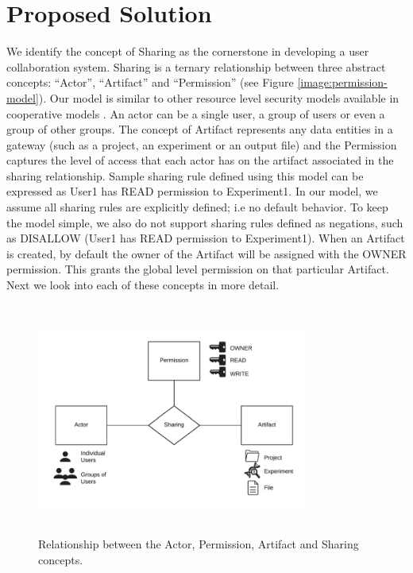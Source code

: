 \documentclass[sigconf]{acmart}
\begin{document}
\section{Proposed Solution}
We identify the concept of Sharing as the cornerstone in developing a user collaboration system. Sharing is a ternary relationship between three abstract concepts: ``Actor'', ``Artifact'' and ``Permission'' (see Figure \ref{image:permission-model}). Our model is similar to other resource level security models available in cooperative models \cite{sikkel1997group}. An actor can be a single user, a group of users or even a group of other groups. The concept of Artifact represents any data entities in a gateway (such as a project, an experiment or an output file) and the Permission captures the level of access that each actor has on the artifact associated in the sharing relationship. Sample sharing rule defined using this model can be expressed as User1 has READ permission to Experiment1. In our model, we assume all sharing rules are explicitly defined; i.e no default behavior. To keep the model simple, we also do not support sharing rules defined as negations, such as DISALLOW (User1 has READ permission to Experiment1). When an Artifact is created, by default the owner of the Artifact will be assigned with the OWNER permission. This grants the global level permission on that particular Artifact. Next we look into each of these concepts in more detail.

\begin{figure}
\includegraphics[height=3in, width=3.5in]{figures/sharing-concepts.pdf}
\caption{Relationship between the Actor, Permission, Artifact and Sharing concepts.}
\end{figure}\label{image:permission-model}
\end{document}
